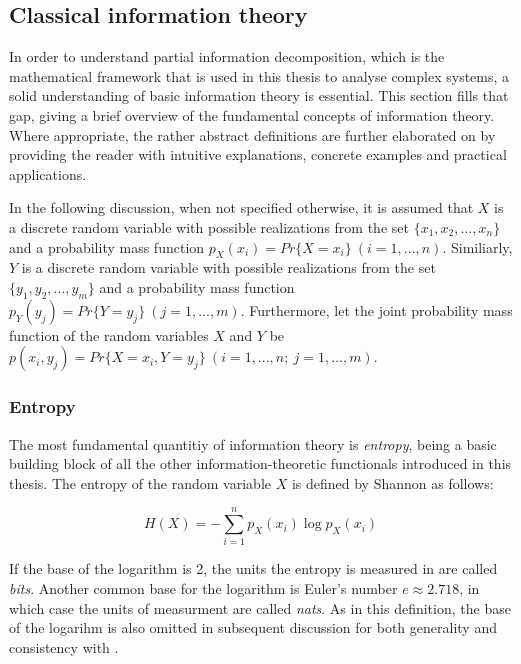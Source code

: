 \documentclass[12pt]{article}
\begin{document}
\subsection{Classical information theory}

In order to understand partial information decomposition, which is the mathematical framework that is used in this thesis to analyse complex systems, a solid understanding of basic information theory is essential. This section fills that gap, giving a brief overview of the fundamental concepts of information theory. Where appropriate, the rather abstract definitions are further elaborated on by providing the reader with intuitive explanations, concrete examples and practical applications. 

In the following discussion, when not specified otherwise, it is assumed that $X$ is a discrete random variable with possible realizations from the set $\{x_1, x_2, ..., x_n\}$ and a probability mass function $p_X(x_i) = Pr\{X = x_i\} \ (i = 1, ..., n)$. Similiarly, $Y$ is a discrete random variable with possible realizations from the set $\{y_1, y_2, ..., y_m\}$ and a probability mass function $p_Y(y_j) = Pr\{Y = y_j\} \ (j = 1, ..., m)$. Furthermore, let the joint probability mass function of the random variables $X$ and $Y$ be $p(x_i, y_j) = Pr\{X = x_i, Y = y_j\} \ (i = 1, ..., n; \ j = 1, ..., m)$. 

\subsubsection{Entropy}

The most fundamental quantitiy of information theory is \textit{entropy}, being a basic building block of all the other information-theoretic functionals introduced in this thesis. The entropy of the random variable $X$ is defined by Shannon \cite{shannon} as follows: 

\begin{equation}
H(X) = -\sum_{i=1}^{n} p_X(x_i) \log p_X(x_i)
\label{eq:entropy}
\end{equation}

If the base of the logarithm is 2, the units the entropy is measured in are called \textit{bits}. Another common base for the logarithm is Euler's number $e \approx 2.718$, in which case the units of measurment are called \textit{nats}. As in this definition, the base of the logarihm is also omitted in subsequent discussion for both generality and consistency with \cite{cover-thomas}.
\end{document}
